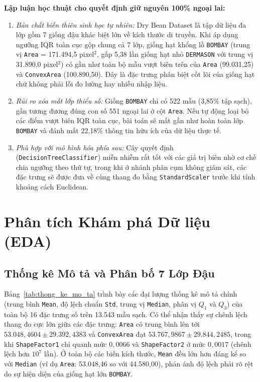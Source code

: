 \documentclass[a4paper,12pt]{report}
\begin{document}
\textbf{Lập luận học thuật cho quyết định giữ nguyên 100\% ngoại lai:}
\begin{enumerate}[leftmargin=*]
    \item \textit{Bản chất biến thiên sinh học tự nhiên:} Dry Bean Dataset là tập dữ liệu đa lớp gồm 7 giống đậu khác biệt lớn về kích thước di truyền. Khi áp dụng ngưỡng IQR toàn cục gộp chung cả 7 lớp, giống hạt khổng lồ \texttt{BOMBAY} (trung vị \texttt{Area} = 171.494,5 pixel$^2$, gấp 5,38 lần giống hạt nhỏ \texttt{DERMASON} với trung vị 31.890,0 pixel$^2$) có gần như toàn bộ mẫu vượt biên trên của \texttt{Area} (99.031,25) và \texttt{ConvexArea} (100.890,50). Đây là đặc trưng phân biệt cốt lõi của giống hạt chứ không phải lỗi đo lường hay nhiễu nhập liệu.
    \item \textit{Rủi ro xóa mất lớp thiểu số:} Giống \texttt{BOMBAY} chỉ có 522 mẫu (3,85\% tập sạch), gần tương đương đúng con số 551 ngoại lai ở cột \texttt{Area}. Nếu tự động loại bỏ các điểm vượt biên IQR toàn cục, bài toán sẽ mất gần như hoàn toàn lớp \texttt{BOMBAY} và đánh mất 22,18\% thông tin hữu ích của dữ liệu thực tế.
    \item \textit{Phù hợp với mô hình hóa phía sau:} Cây quyết định (\texttt{DecisionTreeClassifier}) miễn nhiễm rất tốt với các giá trị biên nhờ cơ chế chia ngưỡng theo thứ tự, trong khi ở nhánh phân cụm không giám sát, các đặc trưng sẽ được đưa về cùng thang đo bằng \texttt{StandardScaler} trước khi tính khoảng cách Euclidean.
\end{enumerate}

\section{Phân tích Khám phá Dữ liệu (EDA)}

\subsection{Thống kê Mô tả và Phân bố 7 Lớp Đậu}
Bảng~\ref{tab:thong_ke_mo_ta} trình bày các đại lượng thống kê mô tả chính (trung bình \texttt{Mean}, độ lệch chuẩn \texttt{Std}, trung vị \texttt{Median}, phân vị $Q_1$ và $Q_3$) của toàn bộ 16 đặc trưng số trên 13.543 mẫu sạch. Có thể nhận thấy sự chênh lệch thang đo cực lớn giữa các đặc trưng: \texttt{Area} có trung bình lên tới $53.048,4604 \pm 29.392,4383$ và \texttt{ConvexArea} đạt $53.767,9867 \pm 29.844,2485$, trong khi \texttt{ShapeFactor1} chỉ quanh mức $0,0066$ và \texttt{ShapeFactor2} ở mức $0,0017$ (chênh lệch hơn $10^7$ lần). Ở toàn bộ các biến kích thước, \texttt{Mean} đều lớn hơn đáng kể so với \texttt{Median} (ví dụ \texttt{Area}: 53.048,46 so với 44.580,00), phản ánh độ lệch phải rõ rệt do sự hiện diện của giống hạt lớn \texttt{BOMBAY}.
\end{document}
